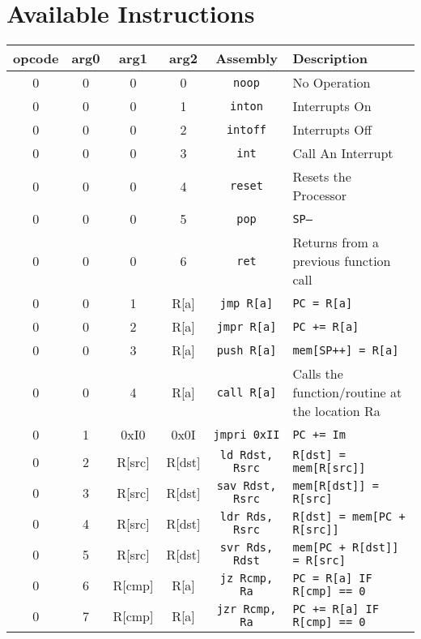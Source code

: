 \documentclass{article}
\begin{document}
\pagebreak

\section{Available Instructions}

\begin{table}[h!]
	\centering
	\begin{footnotesize}
		\begin{tabular}{cccc|c|l}
			\hline
			opcode & arg0 & arg1 & arg2 & Assembly & Description \\
			\hline
			0 & 0 & 0 & 0 & \texttt{noop} & No Operation \\
			0 & 0 & 0 & 1 & \texttt{inton} & Interrupts On \\
			0 & 0 & 0 & 2 & \texttt{intoff} & Interrupts Off \\
			0 & 0 & 0 & 3 & \texttt{int} & Call An Interrupt \\
			0 & 0 & 0 & 4 & \texttt{reset} & Resets the Processor \\
			0 & 0 & 0 & 5 & \texttt{pop} & \texttt{SP--} \\
			0 & 0 & 0 & 6 & \texttt{ret} & Returns from a previous function call \\
			0 & 0 & 1 & R[a] & \texttt{jmp R[a]} & \texttt{PC = R[a]} \\
			0 & 0 & 2 & R[a] & \texttt{jmpr R[a]} & \texttt{PC += R[a]} \\
			0 & 0 & 3 & R[a] & \texttt{push R[a]} & \texttt{mem[SP++] = R[a]} \\
			0 & 0 & 4 & R[a] & \texttt{call R[a]} & Calls the function/routine at the location Ra \\
			0 & 1 & 0xI0 & 0x0I & \texttt{jmpri 0xII} & \texttt{PC += Im} \\
			0 & 2 & R[src] & R[dst] & \texttt{ld Rdst, Rsrc} & \texttt{R[dst] = mem[R[src]]} \\
			0 & 3 & R[src] & R[dst] & \texttt{sav Rdst, Rsrc} & \texttt{mem[R[dst]] = R[src]} \\
			0 & 4 & R[src] & R[dst] & \texttt{ldr Rds, Rsrc} & \texttt{R[dst] = mem[PC + R[src]]} \\
			0 & 5 & R[src] & R[dst] & \texttt{svr Rds, Rdst} & \texttt{mem[PC + R[dst]] = R[src]} \\
			0 & 6 & R[cmp] & R[a] & \texttt{jz Rcmp, Ra} & \texttt{PC = R[a] IF R[cmp] == 0} \\
			0 & 7 & R[cmp] & R[a] & \texttt{jzr Rcmp, Ra} & \texttt{PC += R[a] IF R[cmp] == 0} \\

\end{tabular}
\end{footnotesize}
\end{table}
\end{document}
